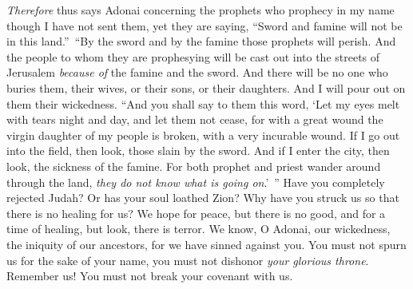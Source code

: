 \begin{biblechapter}
\verse \textit{Therefore} thus says Adonai concerning the prophets who prophecy in my name though I have not sent them, yet they are saying, “Sword and famine will not be in this land.” “By the sword and by the famine those prophets will perish.
\verse And the people to whom they are prophesying will be cast out into the streets of Jerusalem \textit{because of} the famine and the sword. And there will be no one who buries them, their wives, or their sons, or their daughters. And I will pour out on them their wickedness.
 “And you shall say to them this word,
\verse ‘Let my eyes melt with tears night and day, 
and let them not cease, 
for with a great wound the virgin daughter of my people is broken, 
with a very incurable wound.
\verse If I go out into the field, 
then look, those slain by the sword. 
And if I enter the city, 
then look, the sickness of the famine. 
For both prophet and priest wander around through the land, 
\textit{they do not know what is going on}.’ ”
\verse Have you completely rejected Judah? 
Or has your soul loathed Zion? 
Why have you struck us 
so that there is no healing for us? 
We hope for peace, but there is no good, 
and for a time of healing, but look, there is terror.
\verse We know, O Adonai, our wickedness, 
the iniquity of our ancestors, 
for we have sinned against you.
\verse You must not spurn us for the sake of your name, 
you must not dishonor \textit{your glorious throne}. 
Remember us! 
You must not break your covenant with us.
\end{biblechapter}

